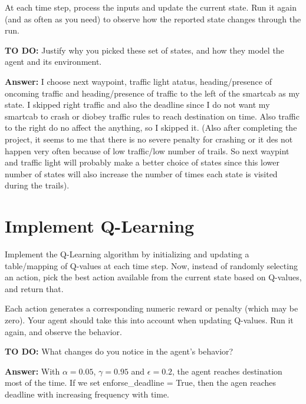 \documentclass{article}
\begin{document}
At each time step, process the inputs and update the current state. Run it again (and as often as you need) to observe how the reported state changes through the run.

\vspace{.5cm}

\noindent\textbf{TO DO:} Justify why you picked these set of states, and how they model the agent and its environment.

\vspace{.2cm}

\noindent\textbf{Answer:} I choose next waypoint, traffic light atatus, heading/presence of oncoming traffic and heading/presence of traffic to the left of the smartcab as my state. I skipped right traffic and also the deadline since I do not want my smartcab to crash or diobey traffic rules to reach destination on time. Also traffic to the right do no affect the anything, so I skipped it. (Also after completing the project, it seems to me that there is no severe penalty for crashing or it des not happen very often because of low traffic/low number of trails. So next waypint and traffic light will probably make a better choice of states since this lower number of states will also increase the number of times each state is visited during the trails).


\section{Implement Q-Learning}

Implement the Q-Learning algorithm by initializing and updating a table/mapping of Q-values at each time step. Now, instead of randomly selecting an action, pick the best action available from the current state based on Q-values, and return that.

Each action generates a corresponding numeric reward or penalty (which may be zero). Your agent should take this into account when updating Q-values. Run it again, and observe the behavior.

\vspace{.5cm}

\noindent\textbf{TO DO:} What changes do you notice in the agent’s behavior?

\vspace{.2cm}

\noindent\textbf{Answer:} With $\alpha=0.05$, $\gamma=0.95$ and $\epsilon=0.2$, the agent reaches destination most of the time. If we set enforse\_deadline = True, then the agen reaches deadline with increasing frequency with time.  
\end{document}
